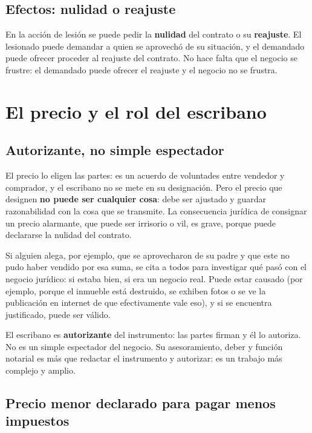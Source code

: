 \documentclass[12pt,oneside]{book}
\begin{document}
\subsection{Efectos: nulidad o reajuste}

En la acci\'on de lesi\'on se puede pedir la \textbf{nulidad} del contrato o su \textbf{reajuste}. El lesionado puede demandar a quien se aprovech\'o de su situaci\'on, y el demandado puede ofrecer proceder al reajuste del contrato. No hace falta que el negocio se frustre: el demandado puede ofrecer el reajuste y el negocio no se frustra.

\section{El precio y el rol del escribano}

\subsection{Autorizante, no simple espectador}

El precio lo eligen las partes: es un acuerdo de voluntades entre vendedor y comprador, y el escribano no se mete en su designaci\'on. Pero el precio que designen \textbf{no puede ser cualquier cosa}: debe ser ajustado y guardar razonabilidad con la cosa que se transmite. La consecuencia jur\'idica de consignar un precio alarmante, que puede ser irrisorio o vil, es grave, porque puede declararse la nulidad del contrato.

Si alguien alega, por ejemplo, que se aprovecharon de su padre y que este no pudo haber vendido por esa suma, se cita a todos para investigar qu\'e pas\'o con el negocio jur\'idico: si estaba bien, si era un negocio real. Puede estar causado (por ejemplo, porque el inmueble est\'a destruido, se exhiben fotos o se ve la publicaci\'on en internet de que efectivamente vale eso), y si se encuentra justificado, puede ser v\'alido.

El escribano es \textbf{autorizante} del instrumento: las partes firman y \'el lo autoriza. No es un simple espectador del negocio. Su asesoramiento, deber y funci\'on notarial es m\'as que redactar el instrumento y autorizar: es un trabajo m\'as complejo y amplio.

\subsection{Precio menor declarado para pagar menos impuestos}
\end{document}
